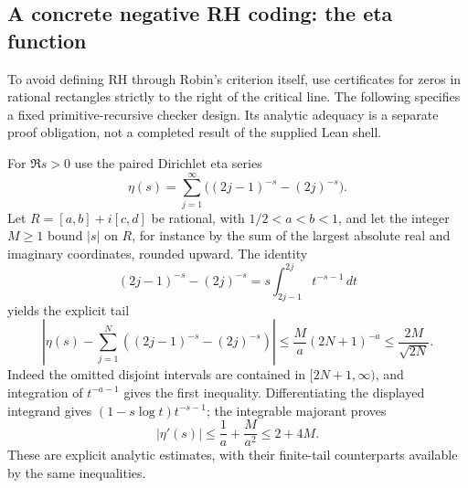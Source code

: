 \subsection{A concrete negative RH coding: the eta function}
\label{sec:etacert}

To avoid defining RH through Robin's criterion itself, use certificates
for zeros in rational rectangles strictly to the right of the critical
line. The following specifies a fixed primitive-recursive checker
design. Its analytic adequacy is a separate proof obligation, not a
completed result of the supplied Lean shell.

For $\Re s>0$ use the paired Dirichlet eta series
\[
 \eta(s)=\sum_{j=1}^{\infty}
       \bigl((2j-1)^{-s}-(2j)^{-s}\bigr).
\]
Let $R=[a,b]+i[c,d]$ be rational, with $1/2<a<b<1$, and let the
integer $M\ge1$ bound $|s|$ on $R$, for instance by the sum of the
largest absolute real and imaginary coordinates, rounded upward.
The identity
\[
 (2j-1)^{-s}-(2j)^{-s}
   =s\int_{2j-1}^{2j}t^{-s-1}\,dt
\]
yields the explicit tail
\begin{equation}\label{eq:eta-tail}
 \left|\eta(s)-\sum_{j=1}^{N}
       ((2j-1)^{-s}-(2j)^{-s})\right|
 \le\frac{M}{a}(2N+1)^{-a}
 \le\frac{2M}{\sqrt{2N}}.
\end{equation}
Indeed the omitted disjoint intervals are contained in
$[2N+1,\infty)$, and integration of $t^{-a-1}$ gives the first
inequality. Differentiating the displayed integrand gives
$(1-s\log t)t^{-s-1}$; the integrable majorant proves
\begin{equation}\label{eq:eta-derivative}
 |\eta'(s)|\le \frac1a+\frac{M}{a^2}\le 2+4M.
\end{equation}
These are explicit analytic estimates, with their finite-tail
counterparts available by the same inequalities.

